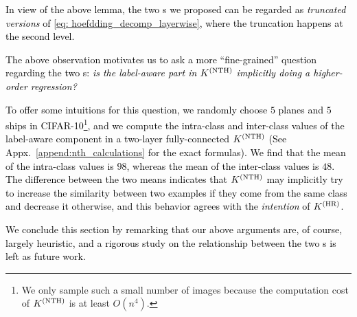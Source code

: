 \textcolor{black}{In view of the above lemma, the two \lantk s we proposed can be regarded as \emph{truncated versions} of \eqref{eq: hoefdding_decomp_layerwise}, where the truncation happens at the second level.}

\textcolor{black}{The above observation motivates us to ask a more ``fine-grained'' question regarding the two \lantk s: \emph{is the label-aware part in $K^{(\textnormal{NTH})}$ implicitly doing a higher-order regression?}}

\textcolor{black}{To offer some intuitions for this question, we randomly choose $5$ planes and $5$ ships in CIFAR-10\footnote{We only sample such a small number of images because the computation cost of $K^{(\textnormal{NTH})}$ is at least $O(n^4)$.}, and we compute the intra-class and inter-class values of the label-aware component in a two-layer fully-connected $K^{(\textnormal{NTH})}$ (See Appx.~\mbox{\ref{append:nth_calculations}} for the exact formulas). We find that the mean of the intra-class values is $98$, whereas the mean of the inter-class values is $48$. The difference between the two means indicates that $K^{(\textnormal{NTH})}$ may implicitly try to increase the similarity between two examples if they come from the same class and decrease it otherwise, and this behavior agrees with the \emph{intention} of $K^{(\textnormal{HR})}$.}

\textcolor{black}{We conclude this section by remarking that our above arguments are, of course, largely heuristic, and a rigorous study on the relationship between the two \lantk s is left as future work.}




















